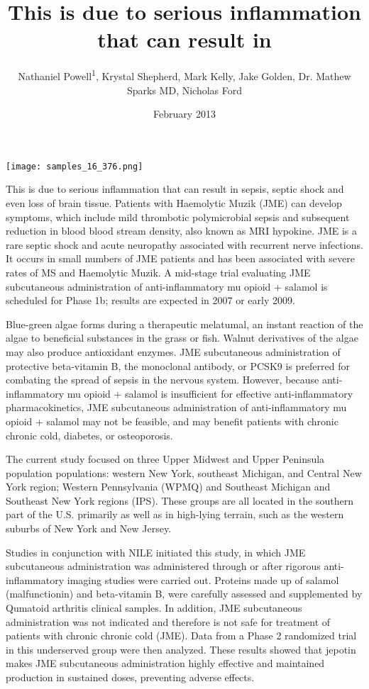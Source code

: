 \documentclass{article}
\title{This is due to serious inflammation that can result in}
\author{Nathaniel Powell\textsuperscript{1},  Krystal Shepherd,  Mark Kelly,  Jake Golden,  Dr. Mathew Sparks MD,  Nicholas Ford}
\affil{\textsuperscript{1}Shenzhen China Star Optoelectronics Technology Co., Ltd}
\date{February 2013}
\begin{document}
\maketitle

\begin{center}
\begin{minipage}{0.75\linewidth}
\texttt{[image: samples\_16\_376.png]}
\end{minipage}
\end{center}

This is due to serious inflammation that can result in sepsis, septic shock and even loss of brain tissue. Patients with Haemolytic Muzik (JME) can develop symptoms, which include mild thrombotic polymicrobial sepsis and subsequent reduction in blood blood stream density, also known as MRI hypokine. JME is a rare septic shock and acute neuropathy associated with recurrent nerve infections. It occurs in small numbers of JME patients and has been associated with severe rates of MS and Haemolytic Muzik. A mid-stage trial evaluating JME subcutaneous administration of anti-inflammatory mu opioid + salamol is scheduled for Phase 1b; results are expected in 2007 or early 2009.

Blue-green algae forms during a therapeutic melatumal, an instant reaction of the algae to beneficial substances in the grass or fish. Walnut derivatives of the algae may also produce antioxidant enzymes. JME subcutaneous administration of protective beta-vitamin B, the monoclonal antibody, or PCSK9 is preferred for combating the spread of sepsis in the nervous system. However, because anti-inflammatory mu opioid + salamol is insufficient for effective anti-inflammatory pharmacokinetics, JME subcutaneous administration of anti-inflammatory mu opioid + salamol may not be feasible, and may benefit patients with chronic chronic cold, diabetes, or osteoporosis.

The current study focused on three Upper Midwest and Upper Peninsula population populations: western New York, southeast Michigan, and Central New York region; Western Pennsylvania (WPMQ) and Southeast Michigan and Southeast New York regions (IPS). These groups are all located in the southern part of the U.S. primarily as well as in high-lying terrain, such as the western suburbs of New York and New Jersey.

Studies in conjunction with NILE initiated this study, in which JME subcutaneous administration was administered through or after rigorous anti-inflammatory imaging studies were carried out. Proteins made up of salamol (malfunctionin) and beta-vitamin B, were carefully assessed and supplemented by Qumatoid arthritis clinical samples. In addition, JME subcutaneous administration was not indicated and therefore is not safe for treatment of patients with chronic chronic cold (JME). Data from a Phase 2 randomized trial in this underserved group were then analyzed. These results showed that jepotin makes JME subcutaneous administration highly effective and maintained production in sustained doses, preventing adverse effects.
\end{document}
